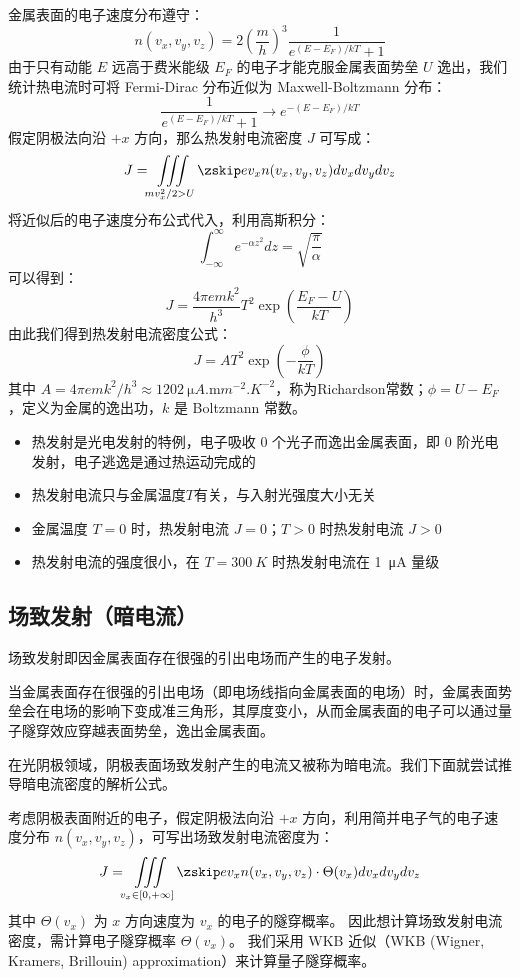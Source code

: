 	金属表面的电子速度分布遵守：
	\[n(v_x, v_y, v_z) = 2\left(\frac{m}{h}\right)^3\frac{1}{e^{(E-E_F)/kT}+1}\]
	由于只有动能 $E$ 远高于费米能级 $E_F$ 的电子才能克服金属表面势垒 $U$ 逸出，我们统计热电流时可将 Fermi-Dirac 分布近似为 Maxwell-Boltzmann 分布：
	\[\frac{1}{e^{(E-E_F)/kT}+1} \rightarrow e^{-(E-E_F)/kT}\]
	假定阴极法向沿 $+x$ 方向，那么热发射电流密度 $J$ 可写成：
	\[J = \iiint\limits_{mv_x^2/2 > U}\zskip ev_xn(v_x, v_y, v_z)dv_xdv_ydv_z\]
	将近似后的电子速度分布公式代入，利用高斯积分：
	\[\int_{-\infty}^{\infty}e^{-\alpha z^2}dz=\sqrt{\frac{\pi}{\alpha}}\]
	可以得到：
	\[J = \frac{4\pi emk^2}{h^3}T^2\exp\left(\frac{E_F-U}{kT}\right)\]
	由此我们得到热发射电流密度公式：
\begin{equation}
	J = AT^2\exp\left(-\frac{\phi}{kT}\right)
\end{equation}
	其中 $A=4\pi emk^2/h^3\approx \SI{1202}{\micro A.\milli m^{-2}.K^{-2}}$，称为Richardson常数；$\phi=U-E_F$，定义为金属的逸出功，$k$ 是 Boltzmann 常数。
  \begin{itemize}
	  \item 热发射是光电发射的特例，电子吸收 0 个光子而逸出金属表面，即 0 阶光电发射，电子逃逸是通过热运动完成的
	  \item 热发射电流只与金属温度$T$有关，与入射光强度大小无关
	  \item 金属温度 $T = 0$ 时，热发射电流 $J = 0$；$T > 0$ 时热发射电流 $J > 0$
	  \item 热发射电流的强度很小，在 $T = \SI{300}{K}$ 时热发射电流在 \SI{1}{\micro A} 量级
  \end{itemize}

\subsection{场致发射（暗电流）}
场致发射即因金属表面存在很强的引出电场而产生的电子发射。

当金属表面存在很强的引出电场（即电场线指向金属表面的电场）时，金属表面势垒会在电场的影响下变成准三角形，其厚度变小，从而金属表面的电子可以通过量子隧穿效应穿越表面势垒，逸出金属表面。

在光阴极领域，阴极表面场致发射产生的电流又被称为暗电流。我们下面就尝试推导暗电流密度的解析公式。

考虑阴极表面附近的电子，假定阴极法向沿 $+x$ 方向，利用简并电子气的电子速度分布 $n(v_x, v_y, v_z)$，可写出场致发射电流密度为：
	\[
	J = \iiint\limits_{v_x \in [0, +\infty]}\zskip ev_xn(v_x, v_y, v_z)\cdot \Theta(v_x)dv_xdv_ydv_z
	\]
	其中 $\Theta(v_x)$ 为 $x$ 方向速度为 $v_x$ 的电子的隧穿概率。
	因此想计算场致发射电流密度，需计算电子隧穿概率 $\Theta(v_x)$。
我们采用 WKB 近似（WKB (Wigner, Kramers, Brillouin) approximation）来计算量子隧穿概率。
